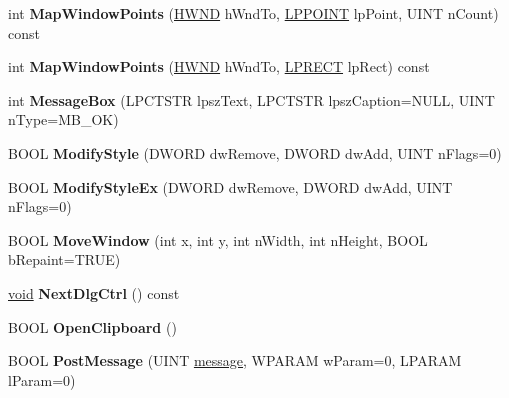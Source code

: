\begin{DoxyCompactItemize}
\mbox{\label{class_a_t_l_1_1_c_window_a6bbc42270b0fb56da1875daeb017476c}} 
int {\bfseries Map\+Window\+Points} (\hyperlink{interfacevoid}{H\+W\+ND} h\+Wnd\+To, \hyperlink{structtag_p_o_i_n_t}{L\+P\+P\+O\+I\+NT} lp\+Point, U\+I\+NT n\+Count) const
\item 
\mbox{\label{class_a_t_l_1_1_c_window_a3567556aecc2eec5f9367f0c26bbf711}} 
int {\bfseries Map\+Window\+Points} (\hyperlink{interfacevoid}{H\+W\+ND} h\+Wnd\+To, \hyperlink{structtag_r_e_c_t}{L\+P\+R\+E\+CT} lp\+Rect) const
\item 
\mbox{\label{class_a_t_l_1_1_c_window_a615116522f423e6e33aa17081ac60452}} 
int {\bfseries Message\+Box} (L\+P\+C\+T\+S\+TR lpsz\+Text, L\+P\+C\+T\+S\+TR lpsz\+Caption=N\+U\+LL, U\+I\+NT n\+Type=M\+B\+\_\+\+OK)
\item 
\mbox{\label{class_a_t_l_1_1_c_window_a1fbb4015279756d46e86855db56ce321}} 
B\+O\+OL {\bfseries Modify\+Style} (D\+W\+O\+RD dw\+Remove, D\+W\+O\+RD dw\+Add, U\+I\+NT n\+Flags=0)
\item 
\mbox{\label{class_a_t_l_1_1_c_window_ad536cb050a9dc6ca3dde5372dc47ee34}} 
B\+O\+OL {\bfseries Modify\+Style\+Ex} (D\+W\+O\+RD dw\+Remove, D\+W\+O\+RD dw\+Add, U\+I\+NT n\+Flags=0)
\item 
\mbox{\label{class_a_t_l_1_1_c_window_a892e0350445c29479df65915871b4064}} 
B\+O\+OL {\bfseries Move\+Window} (int x, int y, int n\+Width, int n\+Height, B\+O\+OL b\+Repaint=T\+R\+UE)
\item 
\mbox{\label{class_a_t_l_1_1_c_window_afd133633edc985db53c804a7d8d0754e}} 
\hyperlink{interfacevoid}{void} {\bfseries Next\+Dlg\+Ctrl} () const
\item 
\mbox{\label{class_a_t_l_1_1_c_window_a2eccbc0737f35faea15877159cc2c426}} 
B\+O\+OL {\bfseries Open\+Clipboard} ()
\item 
\mbox{\label{class_a_t_l_1_1_c_window_ae12575a218c025409481e1eb0e07c84e}} 
B\+O\+OL {\bfseries Post\+Message} (U\+I\+NT \hyperlink{structmessage}{message}, W\+P\+A\+R\+AM w\+Param=0, L\+P\+A\+R\+AM l\+Param=0)

\end{DoxyCompactItemize}
